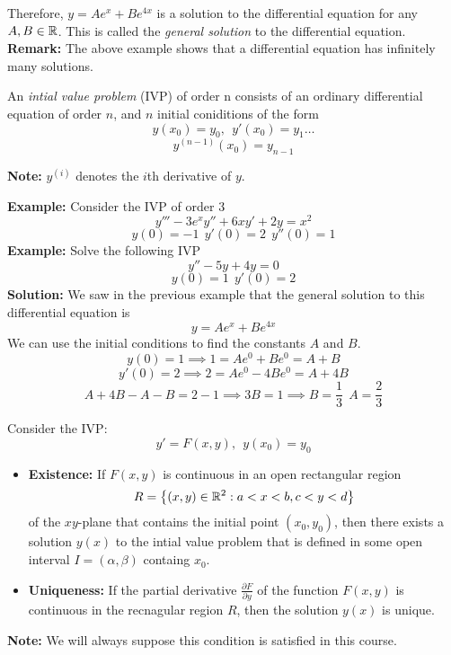 \documentclass[openany]{report}
\begin{document}
Therefore, $y = Ae^x + Be^{4x}$ is a solution to the differential equation for any $A,B \in \mathbb{R}$. This is called the \emph{general solution} to the differential equation. \\[2ex]
\textbf{Remark:} The above example shows that a differential equation has infinitely many solutions.
\begin{definition}
    An \emph{intial value problem} (IVP) of order n consists of an ordinary differential equation of order $n$, and $n$ initial coniditions of the form 
    \[y(x_0) = y_0, \ \ y'(x_0) = y_1 \ldots\]
    \[y^{(n-1)}(x_0) = y_{n-1}\]
\end{definition}
\begin{center}
    \textbf{Note:} $y^{(i)}$ denotes the $i$th derivative of $y$.
\end{center}
\textbf{Example:} Consider the IVP of order 3 
\[y''' - 3e^xy'' + 6xy' + 2y = x^2\]
\[y(0) = -1 \ \ y'(0) = 2 \ \ y''(0) = 1\]
\textbf{Example:} Solve the following IVP
\[y'' - 5y + 4y = 0\]
\[y(0) = 1 \ \ y'(0) = 2\]
\textbf{Solution:} We saw in the previous example that the general solution to this differential equation is 
\[y = Ae^x + Be^{4x}\]
We can use the initial conditions to find the constants $A$ and $B$.
\[y(0) = 1 \implies 1 = Ae^0 + Be^0 = A + B\]
\[y'(0) = 2 \implies 2 = Ae^0 - 4Be^0 = A + 4B\]
\[A + 4B - A - B = 2 - 1 \implies 3B = 1 \implies B = \frac{1}{3} \ \ A = \frac{2}{3}\]
\begin{theorem}
    Consider the IVP: 
    \[y' = F(x,y), \ \ y(x_0) = y_0\]
    \begin{itemize}
        \item \textbf{Existence:} If $F(x,y)$ is continuous in an open rectangular region 
        \[R = \left\{(x,y) \in \mathbb{R}^2: a < x < b, c < y < d\right\}\]
        of the $xy$-plane that contains the initial point $(x_0, y_0)$, then there exists a solution $y(x)$ to the intial value problem that is defined in some open interval $I = (\alpha, \beta)$ containg $x_0$.
        \item \textbf{Uniqueness:} If the partial derivative $\frac{\partial F}{\partial y}$ of the function $F(x,y)$ is continuous in the recnagular region $R$, then the solution $y(x)$ is unique.
    \end{itemize}
\end{theorem}
\begin{center}
    \textbf{Note:} We will always suppose this condition is satisfied in this course.
\end{center}
\end{document}
